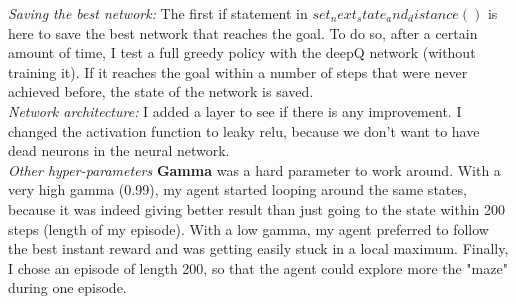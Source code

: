 \documentclass{article}[12pt]
\begin{document}
\textit{Saving the best network: } The first if statement in $set_next_state_and_distance()$ is here to save the best network that reaches the goal. To do so, after a certain amount of time, I test a full greedy policy with the deepQ network (without training it). If it reaches the goal within a number of steps that were never achieved before, the state of the network is saved.\\

\textit{Network architecture: } I added a layer to see if there is any improvement. I changed the activation function to leaky relu, because we don't want to have dead neurons in the neural network.\\

\textit{Other hyper-parameters} \textbf{Gamma} was a hard parameter to work around. With a very high gamma (0.99), my agent started looping around the same states, because it was indeed giving better result than just going to the state within 200 steps (length of my episode). With a low gamma, my agent preferred to follow the best instant reward and was getting easily stuck in a local maximum. Finally, I chose an episode of length 200, so that the agent could explore more the "maze" during one episode. 
\end{document}
